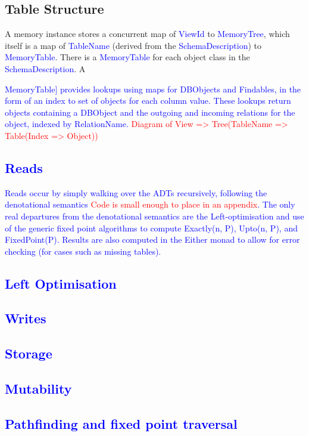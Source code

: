 \documentclass[12pt,a4paper,twoside,openright]{report}
\newcommand\todo[1]{\textcolor{red}{#1}}
\newcommand\codeName[1]{\textcolor{blue}{#1}}
\begin{document}
	\subsection{Table Structure}
	A memory instance stores a concurrent map of \codeName{ViewId} to \codeName{MemoryTree}, which itself is a map of \codeName{TableName} (derived from the \codeName{SchemaDescription}) to \codeName{MemoryTable}. There is a \codeName{MemoryTable} for each object class in the \codeName{SchemaDescription}. A \codeName{MemoryTable] provides lookups using maps for \codeName{DBObjects} and \codeName{Findable}s, in the form of an index to set of objects for each column value. These lookups return objects containing a \codeName{DBObject} and the outgoing and incoming relations for the object, indexed by \codeName{RelationName}. 
	\todo{Diagram of View => Tree(TableName => Table(Index => Object)) }

	
	\subsection{Reads}
Reads occur by simply walking over the ADTs recursively, following the denotational semantics \todo{Code is small enough to place in an appendix}. The only real departures from the denotational semantics are the Left-optimisation and use of the generic fixed point algorithms to compute \codeName{Exactly(n, P)}, \codeName{Upto(n, P)}, and \codeName{FixedPoint(P)}. Results are also computed in the \codeName{Either} monad to allow for error checking (for cases such as missing tables).
	
	\subsection{Left Optimisation}
	\subsection{Writes}
	\subsection{Storage}
	\subsection{Mutability}
	\subsection{Pathfinding and fixed point traversal}

}
\end{document}

